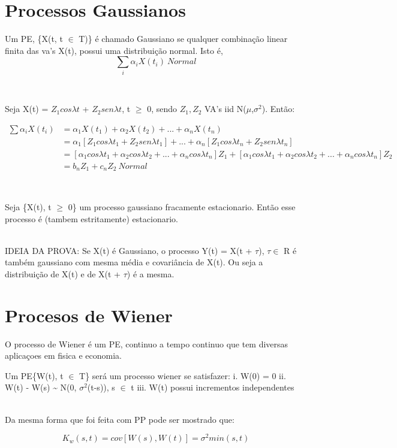 \documentclass[]{article}
\theoremstyle{definition}
\theoremstyle{definition}
\theoremstyle{definition}
\theoremstyle{remark}
\let\BeginKnitrBlock\begin \let\EndKnitrBlock\end
\begin{document}
\section{Processos Gaussianos}\label{processos-gaussianos}

\BeginKnitrBlock{definition}
\protect\hypertarget{def:unnamed-chunk-66}{}{\label{def:unnamed-chunk-66}
}Um PE, \{X(t, t \(\in\) T)\} é chamado Gaussiano se qualquer combinação
linear finita das va's X(t), possui uma distribuição normal. Isto é,
\[\sum_i \alpha_i X(t_i)~Normal\]
\EndKnitrBlock{definition}\\
\BeginKnitrBlock{example}
\protect\hypertarget{exm:unnamed-chunk-67}{}{\label{exm:unnamed-chunk-67}
}Seja X(t) = \(Z_1 cos \lambda t\) + \(Z_2 sen \lambda t\), t \(\geq\)
0, sendo \(Z_1,Z_2\) VA's iid N(\(\mu\),\(\sigma^2\)). Então:

\begin{equation}
\begin{split}
\sum \alpha_i X(t_i) &= \alpha_1 X(t_1) + \alpha_2 X(t_2) + ... +
     \alpha_n X(t_n)\\
&= \alpha_1[Z_1 cos \lambda t_1 + Z_2 sen \lambda t_1] + ... +
   \alpha_n[Z_1 cos \lambda t_n + Z_2 sen \lambda t_n]\\
&= [\alpha_1 cos \lambda t_1 + \alpha_2 cos \lambda t_2 + ... + \alpha_n
   cos \lambda t_n]Z_1 + [\alpha_1 cos \lambda t_1 + \alpha_2 cos \lambda t_2 + ... + \alpha_n
   cos \lambda t_n]Z_2\\
&= b_nZ_1 + c_nZ_2 ~ Normal
\end{split}
\end{equation}
\EndKnitrBlock{example}\\
\BeginKnitrBlock{theorem}
\protect\hypertarget{thm:unnamed-chunk-68}{}{\label{thm:unnamed-chunk-68}
}Seja \{X(t), t \(\geq\) 0\} um processo gaussiano fracamente
estacionario. Então esse processo é (tambem estritamente) estacionario.
\EndKnitrBlock{theorem}\\
IDEIA DA PROVA: Se X(t) é Gaussiano, o processo Y(t) = X(t + \(\tau\)),
\(\tau \in\) R é também gaussiano com mesma média e covariância de X(t).
Ou seja a distribuição de X(t) e de X(t + \(\tau\)) é a mesma.

\section{Procesos de Wiener}\label{procesos-de-wiener}

O processo de Wiener é um PE, continuo a tempo continuo que tem diversas
aplicaçoes em fisica e economia.

\BeginKnitrBlock{definition}
\protect\hypertarget{def:unnamed-chunk-69}{}{\label{def:unnamed-chunk-69}
}Um PE\{W(t), t \(\in\) T\} será um processo wiener se satisfazer: i.
W(0) = 0 ii. W(t) - W(s) \textasciitilde{} N(0, \(\sigma^2\)(t-s)), s
\(\in\) t iii. W(t) possui incrementos independentes
\EndKnitrBlock{definition}\\
Da mesma forma que foi feita com PP pode ser mostrado que:

\[K_w(s,t) = cov[W(s),W(t)]= \sigma^2 min(s,t)\]
\end{document}
